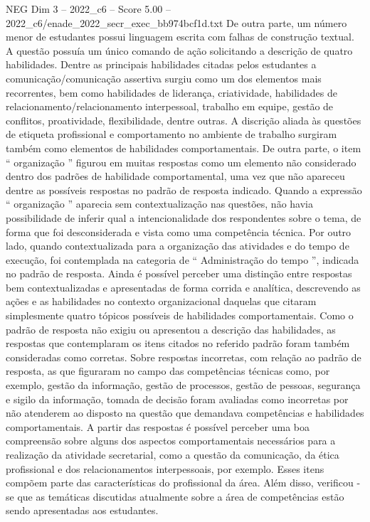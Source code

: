 \begin{textsample}{NEG Dim 3 – 2022\_c6 – Score 5.00 – 2022\_c6/enade\_2022\_secr\_exec\_bb974bcf1d.txt}
De outra parte, um número menor de estudantes possui linguagem escrita com falhas de construção textual.
A questão possuía um único comando de ação solicitando a descrição de quatro habilidades.
Dentre as principais habilidades citadas pelos estudantes a comunicação/comunicação assertiva surgiu como um dos elementos mais recorrentes, bem como habilidades de liderança, criatividade, habilidades de relacionamento/relacionamento interpessoal, trabalho em equipe, gestão de conflitos, proatividade, flexibilidade, dentre outras.
A discrição aliada às questões de etiqueta profissional e comportamento no ambiente de trabalho surgiram também como elementos de habilidades comportamentais.
De outra parte, o item “ organização ” figurou em muitas respostas como um elemento não considerado dentro dos padrões de habilidade comportamental, uma vez que não apareceu dentre as possíveis respostas no padrão de resposta indicado.
Quando a expressão “ organização ” aparecia sem contextualização nas questões, não havia possibilidade de inferir qual a intencionalidade dos respondentes sobre o tema, de forma que foi desconsiderada e vista como uma competência técnica.
Por outro lado, quando contextualizada para a organização das atividades e do tempo de execução, foi contemplada na categoria de “ Administração do tempo ”, indicada no padrão de resposta.
Ainda é possível perceber uma distinção entre respostas bem contextualizadas e apresentadas de forma corrida e analítica, descrevendo as ações e as habilidades no contexto organizacional daquelas que citaram simplesmente quatro tópicos possíveis de habilidades comportamentais.
Como o padrão de resposta não exigiu ou apresentou a descrição das habilidades, as respostas que contemplaram os itens citados no referido padrão foram também consideradas como corretas.
Sobre respostas incorretas, com relação ao padrão de resposta, as que figuraram no campo das competências técnicas como, por exemplo, gestão da informação, gestão de processos, gestão de pessoas, segurança e sigilo da informação, tomada de decisão foram avaliadas como incorretas por não atenderem ao disposto na questão que demandava competências e habilidades comportamentais.
A partir das respostas é possível perceber uma boa compreensão sobre alguns dos aspectos comportamentais necessários para a realização da atividade secretarial, como a questão da comunicação, da ética profissional e dos relacionamentos interpessoais, por exemplo.
Esses itens compõem parte das características do profissional da área.
Além disso, verificou -se que as temáticas discutidas atualmente sobre a área de competências estão sendo apresentadas aos estudantes.

\end{textsample}

